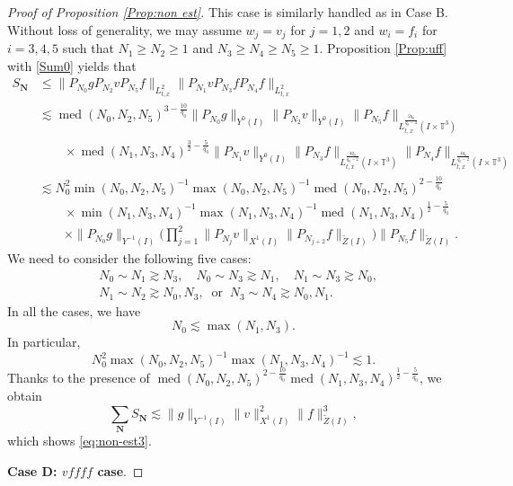 \documentclass[letterpaper, 11pt,  reqno]{amsart}
\DeclareMathOperator{\med}{med}
\newcommand{\1}{\hspace{0.5mm}\text{I}\hspace{0.5mm}}
\newcommand{\noi}{\noindent}
\newcommand{\T}{\mathbb{T}}
\newcommand{\wt}{\widetilde}
\newcommand{\les}{\lesssim}
\newcommand{\ges}{\gtrsim}
\newcommand{\Nb}{\mathbf{N}}
\numberwithin{equation}{section}
\numberwithin{theorem}{section}
\begin{document}
\begin{proof}[Proof of Proposition \ref{Prop:non est}]
This case is similarly handled as in Case B.
Without loss of generality,  we may
assume $w_j=v_j$ for $j=1,2$
and $w_i=f_i$ for $i=3,4,5$
such that 
$N_1\geq N_2\geq 1$ 
and $N_3\geq N_4\geq N_5\geq 1$.
Proposition \ref{Prop:uff} with \eqref{Sum0} yields that
\begin{align*}
S_{\Nb}
&\le
\|P_{N_0} g P_{N_2}v P_{N_5}f\|_{L_{t,x}^2}
\|P_{N_1}v P_{N_3}f P_{N_4}f\|_{L_{t,x}^2}
\\
&\les
\med(N_0,N_2,N_5)^{3-\frac{10}{q_0}}
\|P_{N_0}g\|_{Y^0(I)}
\|P_{N_2}v\|_{Y^0(I)}
\|P_{N_5}f\|_{L_{t,x}^{\frac{2q_0}{q_0-4}}(I \times \T^3)}
\\
&\qquad
\times
\med(N_1,N_3,N_4)^{\frac 32-\frac{5}{q_0}}
\|P_{N_1}v\|_{Y^0(I)}
\|P_{N_3}f\|_{L_{t,x}^{\frac{4q_0}{q_0-2}} (I \times \T^3)}
\|P_{N_4}f\|_{L_{t,x}^{\frac{4q_0}{q_0-2}} (I \times \T^3)}
\\
&\les
N_0^2
\min(N_0,N_2,N_5)^{-1}
\max(N_0,N_2,N_5)^{-1}
\med(N_0,N_2,N_5)^{2-\frac{10}{q_0}}
\\
&\qquad
\times
\min(N_1,N_3,N_4)^{-1}
\max(N_1,N_3,N_4)^{-1}
\med(N_1,N_3,N_4)^{\frac 12 -\frac{5}{q_0}}
\\
&\qquad
\times
\|P_{N_0}g\|_{Y^{-1}(I)}
\bigg(
\prod_{j=1}^2 \| P_{N_j} v \|_{X^1(I)}
\| P_{N_{j+2}} f \|_{\wt Z(I)}
\bigg)
\| P_{N_5} f \|_{\wt Z(I)}
.
\end{align*}
We need to consider the following five cases:
\[
\begin{aligned}
&N_0 \sim N_1 \ges N_3, \quad
N_0 \sim N_3 \ges N_1, \quad
N_1 \sim N_3 \ges N_0, \\
&N_1 \sim N_2 \ges N_0, N_3, \
\text{ or } \
N_3 \sim N_4 \ges N_0, N_1.
\end{aligned}
\]
In all the cases,
we have
\[
N_0 \les
\max (N_1,N_3).
\]
In particular,
\[
N_0^2
\max(N_0,N_2,N_5)^{-1}
\max(N_1,N_3,N_4)^{-1}
\les 1.
\]
Thanks to the presence of
$\med(N_0,N_2,N_5)^{2-\frac{10}{q_0}} \med(N_1,N_3,N_4)^{\frac 12-\frac{5}{q_0}}$,
we obtain
\[
\sum_{\Nb} S_\Nb
\les
\| g \|_{Y^{-1}(I)}
\| v \|_{X^1(I)}^2
\| f \|_{\wt Z(I)}^3,
\]
which shows  \eqref{eq:non-est3}.







\medskip
\noi
{\bf Case D: $vffff$ case}. 
\smallskip



\end{proof}
\end{document}
